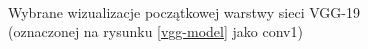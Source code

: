 \begin{figure}
~
\caption{Wybrane wizualizacje początkowej warstwy sieci VGG-19 (oznaczonej na rysunku \ref{vgg-model} jako conv1)}
\label{mean-vgg-vis-c1bx}
\end{figure}

